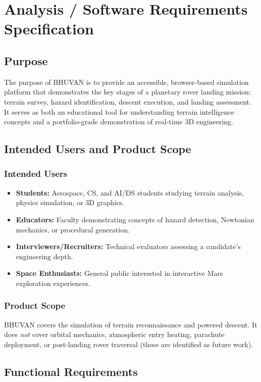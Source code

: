 \chapter{Analysis / Software Requirements Specification}

\section{Purpose}
The purpose of BHUVAN is to provide an accessible, browser-based simulation platform that demonstrates the key stages of a planetary rover landing mission: terrain survey, hazard identification, descent execution, and landing assessment. It serves as both an educational tool for understanding terrain intelligence concepts and a portfolio-grade demonstration of real-time 3D engineering.

\section{Intended Users and Product Scope}

\subsection{Intended Users}
\begin{itemize}
    \item \textbf{Students:} Aerospace, CS, and AI/DS students studying terrain analysis, physics simulation, or 3D graphics.
    \item \textbf{Educators:} Faculty demonstrating concepts of hazard detection, Newtonian mechanics, or procedural generation.
    \item \textbf{Interviewers/Recruiters:} Technical evaluators assessing a candidate's engineering depth.
    \item \textbf{Space Enthusiasts:} General public interested in interactive Mars exploration experiences.
\end{itemize}

\subsection{Product Scope}
BHUVAN covers the simulation of terrain reconnaissance and powered descent. It does \textit{not} cover orbital mechanics, atmospheric entry heating, parachute deployment, or post-landing rover traversal (these are identified as future work).

\section{Functional Requirements}

